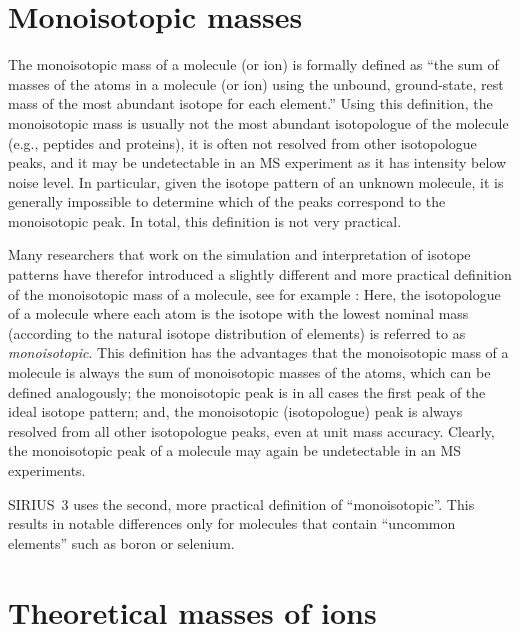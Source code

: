 \documentclass[letterpaper,10pt,openany,oneside]{sphinxmanual}
\begin{document}

\section{Monoisotopic masses}

The monoisotopic mass of a molecule (or ion) is formally defined as ``the sum
of masses of the atoms in a molecule (or ion) using the unbound,
ground-state, rest mass of the most abundant isotope for each element.''
Using this definition, the monoisotopic mass is usually not the most abundant
isotopologue of the molecule (e.g., peptides and proteins), it is often not
resolved from other isotopologue peaks, and it may be undetectable in an
MS experiment as it has intensity below noise level.  In particular, given
the isotope pattern of an unknown molecule, it is generally impossible to
determine which of the peaks correspond to the monoisotopic peak.  In total,
this definition is not very practical.

Many researchers that work on the simulation and interpretation of isotope
patterns have therefor introduced a slightly different and more practical
definition of the monoisotopic mass of a molecule, see for
example \citet{dittwald15fine, meusel16predicting}: Here, the isotopologue of
a molecule where each atom is the isotope with the lowest nominal mass
(according to the natural isotope distribution of elements) is referred to
as \emph{monoisotopic}.  This definition has the advantages that the
monoisotopic mass of a molecule is always the sum of monoisotopic masses of
the atoms, which can be defined analogously; the monoisotopic peak is in all
cases the first peak of the ideal isotope pattern; and, the monoisotopic
(isotopologue) peak is always resolved from all other isotopologue peaks,
even at unit mass accuracy.  Clearly, the monoisotopic peak of a molecule may
again be undetectable in an MS experiments.

SIRIUS~3 uses the second, more practical definition of ``monoisotopic''.  This
results in notable differences only for molecules that contain ``uncommon
elements'' such as boron or selenium.


\section{Theoretical masses of ions}
\end{document}
